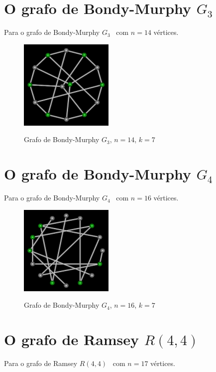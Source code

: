 \section{O grafo de Bondy-Murphy $G_3$}
Para o grafo de Bondy-Murphy $G_3$~\cite{cite:example-bondy} com $n=14$
vértices.

\begin{figure}[htb]
\centering
\includegraphics[width=0.4\textwidth]{img/bondymurphyg3.png}
\label{fig:example-bondymurphyg3}
\caption{Grafo de Bondy-Murphy $G_3$, $n=14$, $k=7$}
\end{figure}


\section{O grafo de Bondy-Murphy $G_4$}
Para o grafo de Bondy-Murphy $G_4$~\cite{cite:example-bondy} com $n=16$
vértices.

\begin{figure}[htb]
\centering
\includegraphics[width=0.4\textwidth]{img/bondymurphyg4.png}
\label{fig:example-bondymurphyg4}
\caption{Grafo de Bondy-Murphy $G_4$, $n=16$, $k=7$}
\end{figure}


\section{O grafo de Ramsey $R(4,4)$}
Para o grafo de Ramsey $R(4,4)$~\cite{cite:example-ramsey} com $n=17$
vértices.

